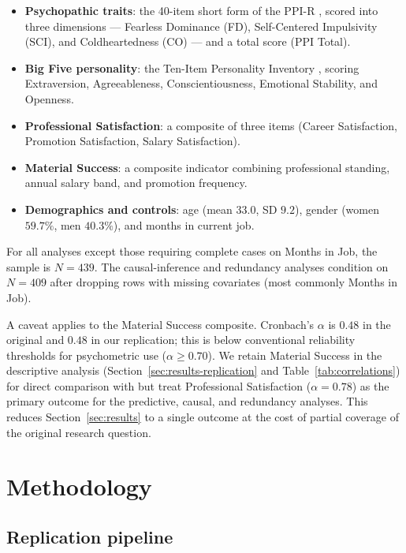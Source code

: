 \documentclass[11pt,a4paper]{article}
\begin{document}
\begin{itemize}
\item \textbf{Psychopathic traits}: the 40-item short form of the
  PPI-R \citep{lilienfeld2005}, scored into three dimensions ---
  Fearless Dominance (FD), Self-Centered Impulsivity (SCI), and
  Coldheartedness (CO) --- and a total score (PPI Total).
\item \textbf{Big Five personality}: the Ten-Item Personality
  Inventory \citep{gosling2003}, scoring Extraversion, Agreeableness,
  Conscientiousness, Emotional Stability, and Openness.
\item \textbf{Professional Satisfaction}: a composite of three
  items (Career Satisfaction, Promotion Satisfaction, Salary
  Satisfaction).
\item \textbf{Material Success}: a composite indicator combining
  professional standing, annual salary band, and promotion frequency.
\item \textbf{Demographics and controls}: age (mean $33.0$, SD
  $9.2$), gender (women $59.7\%$, men $40.3\%$), and months in current
  job.
\end{itemize}

For all analyses except those requiring complete cases on Months in
Job, the sample is $N=439$. The causal-inference and redundancy
analyses condition on $N=409$ after dropping rows with missing
covariates (most commonly Months in Job).

A caveat applies to the Material Success composite. Cronbach's
$\alpha$ is $0.48$ in the original and $0.48$ in our replication;
this is below conventional reliability thresholds for psychometric
use ($\alpha \ge 0.70$). We retain Material Success in the
descriptive analysis (Section~\ref{sec:results-replication} and
Table~\ref{tab:correlations}) for direct comparison with
\citet{eisenbarth2018} but treat Professional Satisfaction
($\alpha=0.78$) as the primary outcome for the predictive, causal,
and redundancy analyses. This reduces Section~\ref{sec:results} to a
single outcome at the cost of partial coverage of the original
research question.

\section{Methodology}
\label{sec:method}

\subsection{Replication pipeline}
\label{sec:method-replication}
\end{document}
